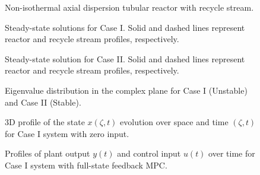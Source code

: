 \begin{figure}[!htbp]
    \caption{Non-isothermal axial dispersion tubular reactor with recycle stream.}
    \label{fig:reactor_scheme}
\end{figure}

\begin{figure}[!htbp]
    \centering
    
    \caption{Steady-state solutions for Case I. Solid and dashed lines represent reactor and recycle stream profiles, respectively.}
    \label{fig:ss_profiles}
\end{figure}

\begin{figure}[!htbp]
    \centering
    
    \caption{Steady-state solution for Case II. Solid and dashed lines represent reactor and recycle stream profiles, respectively.}
    \label{fig:ss_profiles_stable}
\end{figure}

\begin{figure}[!htbp]
    \centering
    
    \caption{Eigenvalue distribution in the complex plane for Case I (Unstable) and Case II (Stable).}
    \label{fig:eigvals}
\end{figure}

\begin{figure}[!htbp]
    \centering
    
    \caption{3D profile of the state $x(\zeta, t)$ evolution over space and time $(\zeta, t)$ for Case I system with zero input.}
    \label{fig:openloop_x}
\end{figure}

\begin{figure}[!htbp]
    \centering
    
    \caption{Profiles of plant output $y(t)$ and control input $u(t)$ over time for Case I system with full-state feedback MPC.}
    \label{fig:input_output_MPC}
\end{figure}

